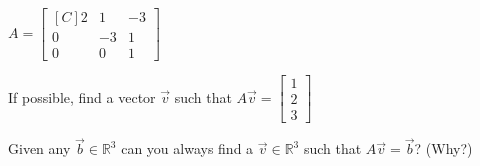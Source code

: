 \begin{exercise}
$A=\begin{bmatrix*}[C]
2 & 1  & -3\\
0 & -3 & 1 \\
0 & 0 & 1 
\end{bmatrix*}$\\
\begin{inparaenum}
\item If possible, find a vector $\vec{v}$ such that 
$A\vec{v}=\begin{bmatrix}1 \\ 2 \\ 3\end{bmatrix}$\\
%
\item Given any $\vec{b} \in \mathbb{R}^3$ can you always find a 
$\vec{v} \in \mathbb{R}^3$ such that $A\vec{v}=\vec{b}$? (Why?)
\end{inparaenum}
\end{exercise}
